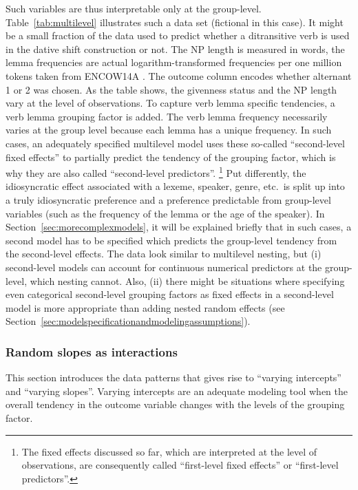 Such variables are thus interpretable only at the group-level.
Table~\ref{tab:multilevel} illustrates such a data set (fictional in this case).
It might be a small fraction of the data used to predict whether a ditransitive verb is used in the dative shift construction or not.
The NP length is measured in words, the lemma frequencies are actual logarithm-transformed frequencies per one million tokens taken from ENCOW14A \citep{SchaeferBildhauer2012}.
The outcome column encodes whether alternant 1 or 2 was chosen.
As the table shows, the givenness status and the NP length vary at the level of observations.
To capture verb lemma specific tendencies, a verb lemma grouping factor is added.
The verb lemma frequency necessarily varies at the group level because each lemma has a unique frequency.
In such cases, an adequately specified multilevel model uses these so-called ``second-level fixed effects'' to partially predict the tendency of the grouping factor, which is why they are also called ``second-level predictors''.%
\footnote{The fixed effects discussed so far, which are interpreted at the level of observations, are consequently called ``first-level fixed effects'' or ``first-level predictors''.}
Put differently, the idiosyncratic effect associated with a lexeme, speaker, genre, etc.\ is split up into a truly idiosyncratic preference and a preference predictable from group-level variables (such as the frequency of the lemma or the age of the speaker).
In Section~\ref{sec:morecomplexmodels}, it will be explained briefly that in such cases, a second model has to be specified which predicts the group-level tendency from the second-level effects.
The data look similar to multilevel nesting, but (i) second-level models can account for continuous numerical predictors at the group-level, which nesting cannot.
Also, (ii) there might be situations where specifying even categorical second-level grouping factors as fixed effects in a second-level model is more appropriate than adding nested random effects (see Section~\ref{sec:modelspecificationandmodelingassumptions}).


\subsubsection{Random slopes as interactions}
\label{sec:randominterceptsandslopes}

This section introduces the data patterns that gives rise to ``varying intercepts'' and ``varying slopes''. 
Varying intercepts are an adequate modeling tool when the overall tendency in the outcome variable changes with the levels of the grouping factor.

